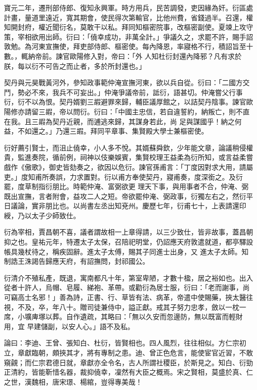 \begin{pinyinscope}
 寶元二年，遷刑部侍郎、復知永興軍。時方用兵，民苦調發，吏因緣為奸。衍區處計畫，量道里遠近，寬其期會，使民得次第輸官，比他州費，省錢過半。召還，權知開封府，權近聞衍名，莫敢干以私。拜同知樞密院事，改樞密副使。夏竦上攻守策，宰相欲用出師。衍曰：「僥幸成功，非萬全計。」爭議久之，求罷不許，賜手詔敦勉。為河東宣撫使，拜吏部侍郎、樞密使。每內降恩，率寢格不行，積詔旨至十數。，輒納帝前。諫官歐陽修入對，帝曰：「外
 人知杜衍封還內降邪？凡有求於朕，每以衍不可告之而止者，多於所封還也。」



 契丹與元昊戰黃河外，參知政事範仲淹宣撫河東，欲以兵自從。衍曰：「二國方交鬥，勢必不來，我兵不可妄出。」仲淹爭議帝前，詆衍，語甚切。仲淹嘗父行事衍，衍不以為恨。契丹婿劉三嘏避罪來歸，輔臣議厚館之，以詰契丹陰事。諫官歐陽修亦請留三嘏，帝以問衍。衍曰：「中國主忠信，若自違誓約，納叛亡，則不直在我。且三嘏為契丹近親，而逋逃來歸，其謀身若此，尚
 足與謀國乎！納之何益，不如還之。」乃還三嘏。拜同平章事、集賢殿大學士兼樞密使。



 衍好薦引賢士，而沮止僥幸，小人多不悅。其婿蘇舜欽，少年能文章，論議稍侵權貴，監進奏院，循前例，祠神以伎樂娛賓，集賢校理王益柔為衍所知，或言益柔嘗戲作《傲歌》，御史皆劾奏之，欲因以危衍。諫官孫甫言：「丁度因對求大用，請屬吏。」度知甫所奏誤，力求置對。衍以甫方奉使契丹，寢甫奏，度深銜之。及衍罷，度草制指衍朋比。時範仲淹、富弼欲更
 理天下事，與用事者不合，仲淹、弼既出宣撫，言者附會，益攻二人之短。帝欲罷仲淹、弼政事，衍獨左右之，然衍平日議論，實非朋比也。以尚書左丞出知兗州。慶歷七年，衍甫七十，上表請還印綬，乃以太子少師致仕。



 衍為宰相，賈昌朝不喜，議者謂故相一上章得請，以三少致仕，皆非故事，蓋昌朝抑之也。皇祐元年，特遷太子太保，召陪祀明堂，仍詔應天府敦遣就道，都亭驛設帳具幾杖待之，稱疾固辭。進太子太傅，賜其子同進士出身，又
 進太子太師。知制誥王洙謁告歸應天府，有詔撫問，封祁國公。



 衍清介不殖私產，既退，寓南都凡十年，第室卑陋，才數十楹，居之裕如也。出入從者十許人，烏帽、皂履、綈袍、革帶。或勸衍為居士服，衍曰：「老而謝事，尚可竊高士名邪！」善為詩，正書、行、草皆有法、病革，帝遣中使賜藥，挾太醫往視，不及，卒，年八十。贈司徒兼侍中，謚正獻。戒其子努力忠孝，斂以一枕一席，小壙庳塚以葬。自作遺疏，其略曰：「無以久安而忽邊防，無以既富而輕財用，宜
 早建儲副，以安人心。」語不及私。



 論曰：李迪、王曾、張知白、杜衍，皆賢相也。四人風烈，往往相似。方仁宗初立，章獻臨朝，頗挾其才，將有專制之患。迪、曾正色危言，能使宦官近習，不敢窺覦；而仁宗君德日就，章獻亦全令名，古人所謂社稷臣，於斯見之。知白、衍勁正清約，皆能靳惜名器，裁抑僥幸，凜然有大臣之概焉。宋之賢相，莫盛於真、仁之世，漢魏相，唐宋璟、楊綰，豈得專美哉！



\end{pinyinscope}